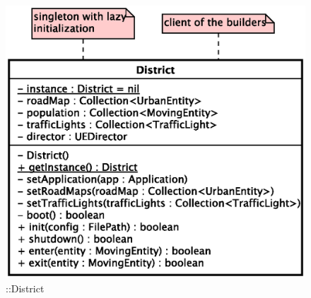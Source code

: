 \begin{figure}[h]
\centering
\includegraphics[scale=0.6,keepaspectratio]{images/solution/district.eps}
\caption{\pReactive::District}
\label{fig:sd-app-district}
\end{figure}
\FloatBarrier
